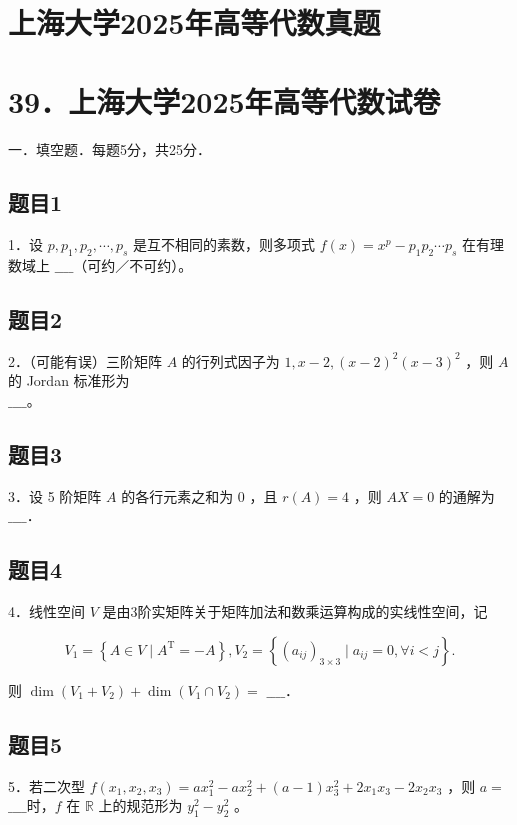 \documentclass{article}
\begin{document}
\section*{上海大学2025年高等代数真题}
\section*{39．上海大学2025年高等代数试卷}
一．填空题．每题5分，共25分．\\

\subsection{题目1}
1．设 \(p, p_{1}, p_{2}, \cdots, p_{s}\) 是互不相同的素数，则多项式 \(f(x)=x^{p}-p_{1} p_{2} \cdots p_{s}\) 在有理数域上 \(\_\_\_\_\)（可约／不可约）。

\subsection{题目2}
2．（可能有误）三阶矩阵 \(A\) 的行列式因子为 \(1, x-2,(x-2)^{2}(x-3)^{2}\) ，则 \(A\) 的 Jordan 标准形为\\
\(\_\_\_\_\)。

\subsection{题目3}
3．设 5 阶矩阵 \(A\) 的各行元素之和为 0 ，且 \(r(A)=4\) ，则 \(A X=0\) 的通解为 \(\_\_\_\_\)．

\subsection{题目4}
4．线性空间 \(V\) 是由3阶实矩阵关于矩阵加法和数乘运算构成的实线性空间，记

\[
V_{1}=\left\{A \in V \mid A^{\mathrm{T}}=-A\right\}, V_{2}=\left\{\left(a_{i j}\right)_{3 \times 3} \mid a_{i j}=0, \forall i<j\right\} .
\]

则 \(\operatorname{dim}\left(V_{1}+V_{2}\right)+\operatorname{dim}\left(V_{1} \cap V_{2}\right)=\) \(\_\_\_\_\)．

\subsection{题目5}
5．若二次型 \(f\left(x_{1}, x_{2}, x_{3}\right)=a x_{1}^{2}-a x_{2}^{2}+(a-1) x_{3}^{2}+2 x_{1} x_{3}-2 x_{2} x_{3}\) ，则 \(a=\) \(\_\_\_\_\)时，\(f\) 在 \(\mathbb{R}\) 上的规范形为 \(y_{1}^{2}-y_{2}^{2}\) 。
\end{document}
